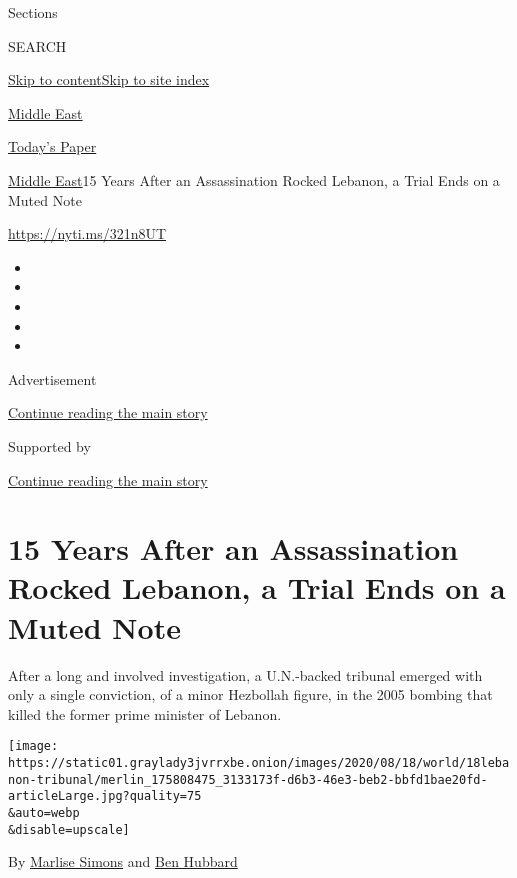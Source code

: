 Sections

SEARCH

\protect\hyperlink{site-content}{Skip to
content}\protect\hyperlink{site-index}{Skip to site index}

\href{https://www.nytimes3xbfgragh.onion/section/world/middleeast}{Middle
East}

\href{https://myaccount.nytimes3xbfgragh.onion/auth/login?response_type=cookie\&client_id=vi}{}

\href{https://www.nytimes3xbfgragh.onion/section/todayspaper}{Today's
Paper}

\href{/section/world/middleeast}{Middle East}\textbar{}15 Years After an
Assassination Rocked Lebanon, a Trial Ends on a Muted Note

\url{https://nyti.ms/321n8UT}

\begin{itemize}
\item
\item
\item
\item
\item
\end{itemize}

Advertisement

\protect\hyperlink{after-top}{Continue reading the main story}

Supported by

\protect\hyperlink{after-sponsor}{Continue reading the main story}

\hypertarget{15-years-after-an-assassination-rocked-lebanon-a-trial-ends-on-a-muted-note}{%
\section{15 Years After an Assassination Rocked Lebanon, a Trial Ends on
a Muted
Note}\label{15-years-after-an-assassination-rocked-lebanon-a-trial-ends-on-a-muted-note}}

After a long and involved investigation, a U.N.-backed tribunal emerged
with only a single conviction, of a minor Hezbollah figure, in the 2005
bombing that killed the former prime minister of Lebanon.

\texttt{[image: https://static01.graylady3jvrrxbe.onion/images/2020/08/18/world/18lebanon-tribunal/merlin\_175808475\_3133173f-d6b3-46e3-beb2-bbfd1bae20fd-articleLarge.jpg?quality=75\\\&auto=webp\\\&disable=upscale]}

By \href{https://www.nytimes3xbfgragh.onion/by/marlise-simons}{Marlise
Simons} and \href{https://www.nytimes3xbfgragh.onion/by/ben-hubbard}{Ben
Hubbard}

